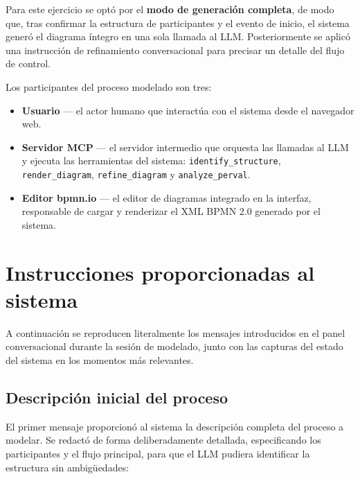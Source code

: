 Para este ejercicio se optó por el \textbf{modo de generación completa}, de modo que, tras confirmar la estructura de participantes y el evento de inicio, el sistema generó el diagrama íntegro en una sola llamada al LLM. Posteriormente se aplicó una instrucción de refinamiento conversacional para precisar un detalle del flujo de control.

Los participantes del proceso modelado son tres:

\begin{itemize}
  \item \textbf{Usuario} --- el actor humano que interactúa con el sistema desde el navegador web.
  \item \textbf{Servidor MCP} --- el servidor intermedio que orquesta las llamadas al LLM y ejecuta las herramientas del sistema: \texttt{identify\_structure}, \texttt{render\_diagram}, \texttt{refine\_diagram} y \texttt{analyze\_perval}.
  \item \textbf{Editor bpmn.io} --- el editor de diagramas integrado en la interfaz, responsable de cargar y renderizar el XML BPMN 2.0 generado por el sistema.
\end{itemize}

\section{Instrucciones proporcionadas al sistema}
\label{sec:anx1-instrucciones}

A continuación se reproducen literalmente los mensajes introducidos en el panel conversacional durante la sesión de modelado, junto con las capturas del estado del sistema en los momentos más relevantes.

\subsection{Descripción inicial del proceso}
\label{subsec:anx1-descInicial}

El primer mensaje proporcionó al sistema la descripción completa del proceso a modelar. Se redactó de forma deliberadamente detallada, especificando los participantes y el flujo principal, para que el LLM pudiera identificar la estructura sin ambigüedades:

